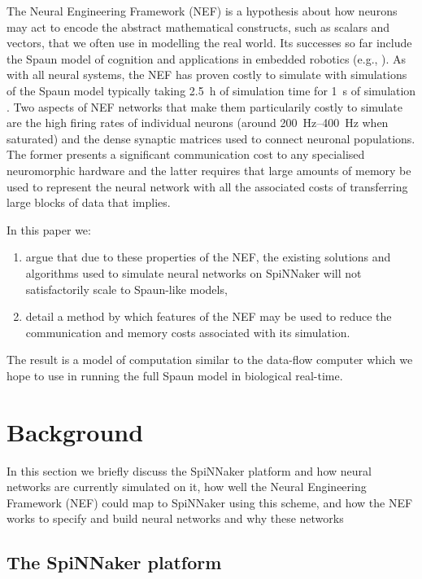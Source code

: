 \documentclass[conference]{IEEEtran}
\begin{document}
The Neural Engineering Framework (NEF) \parencite{Eliasmith2004} is a hypothesis about how neurons may act to encode the abstract mathematical constructs, such as scalars and vectors, that we often use in modelling the real world. Its successes so far include the Spaun model of cognition \parencite{Eliasmith2012} and applications in embedded robotics (e.g., \parencite{Stewart2015ip}). As with all neural systems, the NEF has proven costly to simulate with simulations of the Spaun model typically taking \SI{2.5}{\hour} of simulation time for \SI{1}{\second} of simulation \parencite[\S V]{Stewart2014}. Two aspects of NEF networks that make them particularily costly to simulate are the high firing rates of individual neurons (around \SIrange{200}{400}{\hertz} when saturated) and the dense synaptic matrices used to connect neuronal populations. The former presents a significant communication cost to any specialised neuromorphic hardware and the latter requires that large amounts of memory be used to represent the neural network with all the associated costs of transferring large blocks of data that implies.

  In this paper we:
  \begin{enumerate}
    \item argue that due to these properties of the NEF, the existing solutions and algorithms used to simulate neural networks on SpiNNaker will not satisfactorily scale to Spaun-like models,
    \item detail a method by which features of the NEF may be used to reduce the communication and memory costs associated with its simulation.
  \end{enumerate}

The result is a model of computation similar to the data-flow computer which we hope to use in running the full Spaun model in biological real-time.

  \section{Background}

In this section we briefly discuss the SpiNNaker platform and how neural networks are currently simulated on it, how well the Neural Engineering Framework (NEF) could map to SpiNNaker using this scheme, and how the NEF works to specify and build neural networks and why these networks

  \subsection{The SpiNNaker platform}
\end{document}
